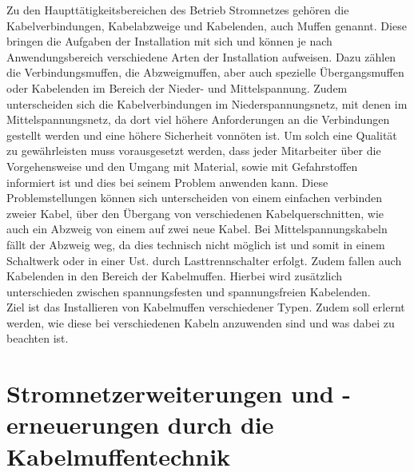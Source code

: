 Zu den Haupttätigkeitsbereichen des Betrieb Stromnetzes gehören die Kabelverbindungen, Kabelabzweige und Kabelenden, auch Muffen genannt. Diese bringen die 
Aufgaben der Installation mit sich und können je nach Anwendungsbereich verschiedene Arten der Installation aufweisen. Dazu zählen \zB die Verbindungsmuffen, 
die Abzweigmuffen, aber auch spezielle Übergangsmuffen oder Kabelenden im Bereich der Nieder- und Mittelspannung. Zudem unterscheiden sich die 
Kabelverbindungen im Niederspannungsnetz, mit denen im Mittelspannungsnetz, da dort viel höhere Anforderungen an die Verbindungen gestellt werden und eine 
höhere Sicherheit vonnöten ist. Um solch eine Qualität zu gewährleisten muss vorausgesetzt werden, dass jeder Mitarbeiter über die Vorgehensweise und den 
Umgang mit Material, sowie mit Gefahrstoffen informiert ist und dies bei seinem Problem anwenden kann. Diese Problemstellungen können sich unterscheiden von 
einem einfachen verbinden zweier Kabel, über den Übergang von verschiedenen Kabelquerschnitten, wie auch ein Abzweig von einem auf zwei neue Kabel. Bei 
Mittelspannungskabeln fällt der Abzweig weg, da dies technisch nicht möglich ist und somit in einem Schaltwerk oder in einer Ust. durch Lasttrennschalter 
erfolgt. Zudem fallen auch Kabelenden in den Bereich der Kabelmuffen. Hierbei wird zusätzlich unterschieden zwischen spannungsfesten und spannungsfreien 
Kabelenden. 
\\
Ziel ist das Installieren von Kabelmuffen verschiedener Typen. Zudem soll erlernt werden, wie diese bei verschiedenen Kabeln anzuwenden sind und was dabei 
zu beachten ist.
\clearpage

\section{Stromnetzerweiterungen und -erneuerungen durch die Kabelmuffentechnik}

